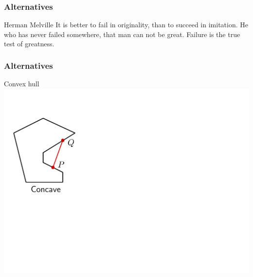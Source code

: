 \documentclass[11pt]{beamer}
\begin{document}
\begin{frame}
  \frametitle{Alternatives}
  \begin{block}{Herman Melville}
    {%
      It is better to fail in originality, than to succeed in
      imitation. %
      He who has never failed somewhere, that man can not be
      great. %
      Failure is the true test of greatness.}
  \end{block}
\end{frame}

\begin{frame}
  \frametitle{Alternatives}
  \begin{block}{Convex hull}
    {%
      \includegraphics[scale=.25]{concave}
    }
  \end{block}
\end{frame}
\end{document}
